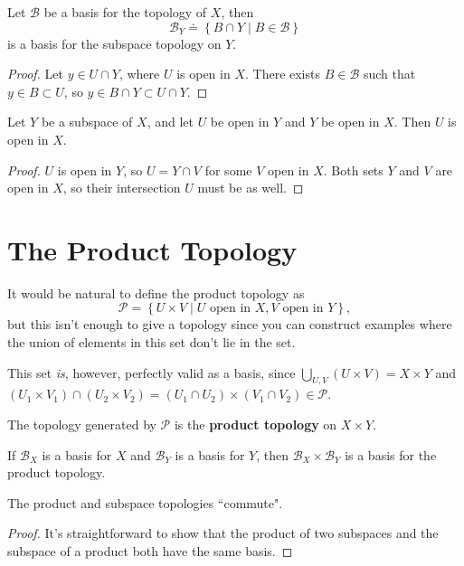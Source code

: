 \documentclass[10pt]{report}
\begin{document}
\begin{prop}
Let $\mathcal{B}$ be a basis for the topology of $X$, then \[\mathcal{B}_Y \doteq \left\{ B \cap Y \;|\; B \in \mathcal{B} \right\}\] is a basis for the subspace topology on $Y$.
\end{prop}
\begin{proof}
	Let $y \in U \cap Y$, where $U$ is open in $X$. There exists $B \in \mathcal{B}$ such that $y \in B \subset U$, so $y \in B \cap Y \subset U \cap Y$.
\end{proof}

\begin{prop}
	Let $Y$ be a subspace of $X$, and let $U$ be open in $Y$ and $Y$ be open in $X$. Then $U$ is open in $X$.
\end{prop}
\begin{proof}
	$U$ is open in $Y$, so $U=Y \cap V$ for some $V$ open in $X$. Both sets $Y$ and $V$ are open in $X$, so their intersection $U$ must be as well.
\end{proof}


\section{The Product Topology}

It would be natural to define the product topology as
\[
	\mathcal{P}= \left\{ U \times V \;|\; U \text{ open in } X, V \text{ open in } Y \right\},
\]but this isn't enough to give a topology since you can construct examples where the union of elements in this set don't lie in the set.

This set \textit{is}, however, perfectly valid as a basis, since $\bigcup_{U,V}(U\times V)=X\times Y$ and $(U_1 \times V_1) \cap (U_2 \times V_2) = (U_1 \cap U_2) \times (V_1 \cap V_2) \in \mathcal{P}$.

\begin{defn}[]
The topology generated by $\mathcal{P}$ is the \textbf{product topology} on $X \times Y$.
\end{defn}

\begin{prop}
If $\mathcal{B}_X$ is a basis for $X$ and $\mathcal{B}_Y$ is a basis for $Y$, then $\mathcal{B}_X \times \mathcal{B}_Y$ is a basis for the product topology.
\end{prop}

\begin{prop}
	The product and subspace topologies ``commute".
\end{prop}
\begin{proof}
	It's straightforward to show that the product of two subspaces and the subspace of a product both have the same basis.
\end{proof}
\end{document}
